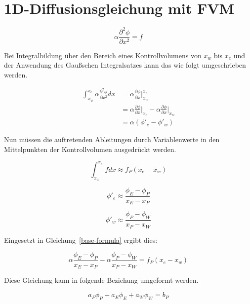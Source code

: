 \documentclass[11pt, ngerman,colorback,accentcolor=tud2d]{tudreport}
\begin{document}
\chapter{1D-Diffusionsgleichung mit FVM}

\begin{equation} \label{base-formula}
\alpha \frac{\partial^2 \phi}{\partial x^2} = f
\end{equation}

Bei Integralbildung über den Bereich eines Kontrollvolumens von $x_w$ bis $x_e$
und der Anwendung des Gaußschen Integralsatzes kann das wie folgt umgeschrieben werden.

\begin{align*}
\int_{x_w}^{x_e}\alpha \frac{\partial^2 \phi}{\partial x^2} dx
&= \alpha \frac{\partial \phi}{\partial x}\Big|_{x_w}^{x_e}\\
&= \alpha \frac{\partial \phi}{\partial x}\Big|_{x_e}
 - \alpha \frac{\partial \phi}{\partial x}\Big|_{x_w}\\
&= \alpha (\phi'_e - \phi'_w)
\end{align*}

Nun müssen die auftretenden Ableitungen durch Variablenwerte in den Mittelpunkten
der Kontrollvolumen ausgedrückt werden.

\begin{equation*}
\int_{x_w}^{x_e}f dx \approx f_P (x_e - x_w)
\end{equation*}

\begin{equation*}
\phi'_e \approx \frac{\phi_E - \phi_P}{x_E - x_P}
\end{equation*}

\begin{equation*}
\phi'_w \approx \frac{\phi_P - \phi_W}{x_P - x_W}
\end{equation*}

Eingesetzt in Gleichung~\ref{base-formula} ergibt dies:

\begin{equation}
\alpha \frac{\phi_E - \phi_P}{x_E - x_P} - \alpha \frac{\phi_P - \phi_W}{x_P - x_W}
= f_P (x_e - x_w)
\end{equation}

Diese Gleichung kann in folgende Beziehung umgeformt werden.

\newcommand{\diffEP}{(x_E-x_P)}
\newcommand{\diffPW}{(x_P-x_W)}
\newcommand{\diffew}{(x_e-x_w)}

\begin{equation}
a_P \phi_P + a_E \phi_E + a_W \phi_W = b_P
\end{equation}
\end{document}
